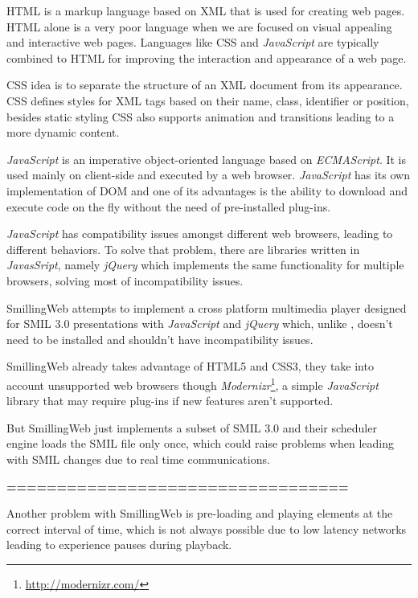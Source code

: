   \ac{HTML} is a markup language based on \ac{XML} that is used for creating web pages. \ac{HTML} alone is a very poor language when we are focused on visual appealing and interactive web pages. Languages like \ac{CSS} and \textit{JavaScript} are typically combined to \ac{HTML} for improving the interaction and appearance of a web page. 

  \ac{CSS} idea is to separate the structure of an \ac{XML} document from its appearance. \ac{CSS} defines styles for \ac{XML} tags based on their name, class, identifier or position, besides static styling \ac{CSS} also supports animation and transitions leading to a more dynamic content.

  \textit{JavaScript} is an imperative object-oriented language based on \textit{ECMAScript}. It is used mainly on client-side and executed by a web browser. \textit{JavaScript} has its own implementation of \ac{DOM} and one of its advantages is the ability to download and execute code on the fly without the need of pre-installed plug-ins.

  \textit{JavaScript} has compatibility issues amongst different web browsers, leading to different behaviors. To solve that problem, there are libraries written in \textit{JavasSript}, namely \textit{jQuery} which implements the same functionality for multiple browsers, solving most of incompatibility issues.

  SmillingWeb \cite{smillingweb} attempts to implement a cross platform multimedia player designed for \ac{SMIL} 3.0 presentations with \textit{JavaScript} and \textit{jQuery} which, unlike \cite{ambulant}, doesn't need to be installed and shouldn't have incompatibility issues. 

  SmillingWeb already takes advantage of \ac{HTML}5 and \ac{CSS}3, they take into account unsupported web browsers though \textit{Modernizr}\footnote{\url{http://modernizr.com/}}, a simple \textit{JavaScript} library that may require plug-ins if new features aren't supported.  

  But SmillingWeb just implements a subset of \ac{SMIL} 3.0 and their scheduler engine loads the \ac{SMIL} file only once, which could raise problems when leading with \ac{SMIL} changes due to real time communications.

\textbf{\color{red}==================================}

  Another problem with SmillingWeb is pre-loading and playing elements at the correct interval of time, which is not always possible due to low latency networks leading to experience pauses during playback.

